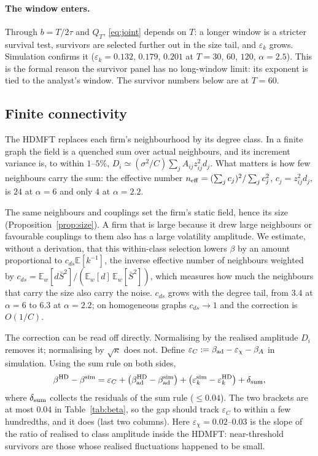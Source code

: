 \documentclass[11pt]{article}
\newcommand{\E}{\mathbb E}
\newcommand{\bad}{\beta_{\rm ad}}
\begin{document}
\paragraph{The window enters.}  Through $b=T/2\tau$ and $Q_T$, \eqref{eq:joint} depends on $T$: a
longer window is a stricter survival test, survivors are selected further out in the size tail,
and $\varepsilon_k$ grows.  Simulation confirms it ($\varepsilon_k=0.132$, $0.179$, $0.201$ at
$T=30$, $60$, $120$, $\alpha=2.5$).  This is the formal reason the survivor panel has no
long-window limit: its exponent is tied to the analyst's window.  The survivor numbers below are
at $T=60$.

\subsection{Finite connectivity}
\label{sec:finiteC}

The HDMFT replaces each firm's neighbourhood by its degree class.  In a finite graph the field is
a quenched sum over actual neighbours, and its increment variance is, to within $1$--$5\%$,
$D_i\simeq(\sigma^2/C)\sum_jA_{ij}z_{ij}^2d_j$.  What matters is how few neighbours carry the sum:
the effective number $n_{\rm eff}=(\sum_jc_j)^2/\sum_jc_j^2$, $c_j=z_{ij}^2d_j$, is $24$ at $\alpha=6$
and only $4$ at $\alpha=2.2$.

The same neighbours and couplings set the firm's static field, hence its size
(Proposition~\ref{prop:size}).  A firm that is large because it drew large neighbours or
favourable couplings to them also has a large volatility amplitude.  We estimate, without a derivation, that this within-class selection
lowers $\beta$ by an amount proportional to $c_{ds}\E[k^{-1}]$, the inverse effective number of
neighbours weighted by $c_{ds}=\E_w[d\bar S^2]/(\E_w[d]\,\E_w[\bar S^2])$, which measures how much the
neighbours that carry the size also carry the noise.  $c_{ds}$ grows with the degree tail, from
$3.4$ at $\alpha=6$ to $6.3$ at $\alpha=2.2$; on homogeneous graphs $c_{ds}\to1$ and the correction
is $O(1/C)$.

The correction can be read off directly.  Normalising by the realised amplitude $D_i$ removes it;
normalising by $\sqrt\kappa$ does not.  Define $\varepsilon_C:=\bad-\varepsilon_\chi-\beta_A$ in simulation.  Using the sum rule on both sides,
\[
  \beta^{\rm HD}-\beta^{\rm sim}=\varepsilon_C+\bigl(\bad^{\rm HD}-\bad^{\rm sim}\bigr)
  +\bigl(\varepsilon_k^{\rm sim}-\varepsilon_k^{\rm HD}\bigr)+\delta_{\rm sum},
\]
where $\delta_{\rm sum}$ collects the residuals of the sum rule ($\le0.04$).  The two brackets are
at most $0.04$ in Table~\ref{tab:beta}, so the gap should track $\varepsilon_C$ to within a few
hundredths, and it does (last two columns).  Here $\varepsilon_\chi=0.02$--$0.03$ is the slope of the ratio of realised to
class amplitude inside the HDMFT: near-threshold survivors are those whose realised fluctuations
happened to be small.
\end{document}
